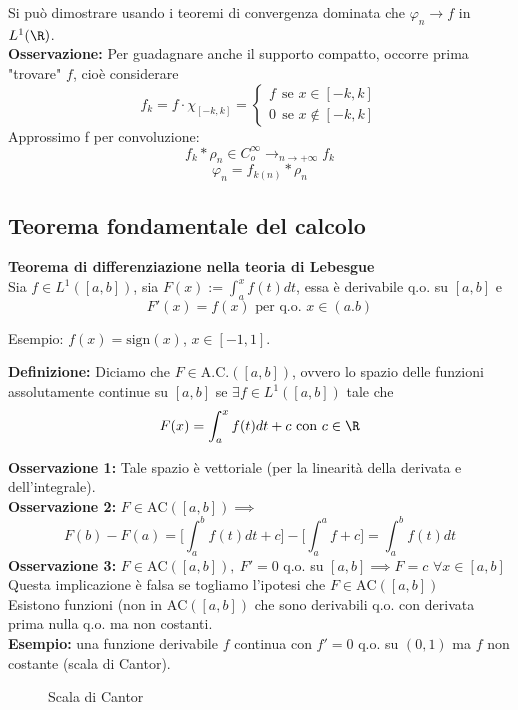 Si può dimostrare usando i teoremi di convergenza dominata che $\varphi_n\to f$ in $L^{1}(\R)$.
\\\textbf{Osservazione:} Per guadagnare anche il supporto compatto, occorre prima "trovare" $f$, cioè considerare
\[f_k=f\cdot \chi_{[-k,k]}=\begin{cases}
	f\ \ \text{se }x\in [-k,k]
	\\0\ \ \text{se }x\not\in [-k,k]
\end{cases}\]
Approssimo f per convoluzione:
\[f_k*\rho_n\in C_o^\infty\to _{n\to +\infty}f_k\]
\[\varphi_n=f_{k(n)}*\rho_n\]
\subsection{Teorema fondamentale del calcolo}
\begin{tcolorbox}
\textbf{Teorema di differenziazione nella teoria di Lebesgue}
\\Sia $f\in L^{1}([a,b])$, sia $F(x):=\int_{a}^{x} f(t)dt$, essa è derivabile q.o. su $[a,b]$ e
\[F'(x)=f(x)\text{ per q.o. }x\in (a.b)\]
\end{tcolorbox}
Esempio: $f(x)=\text{sign}(x)$, $x\in [-1,1]$.
\begin{tcolorbox}
	\textbf{Definizione: }Diciamo che $F\in \text{A.C.}([a,b])$, ovvero lo spazio delle funzioni assolutamente continue su $[a,b]$ se $\exists f\in L^{1}([a,b])$ tale che
	\[F(x)=\int_{a}^{x} f(t)dt+c\text{ con }c\in \R\]
\end{tcolorbox}
\textbf{Osservazione 1:} Tale spazio è vettoriale (per la linearità della derivata e dell'integrale).
\\\textbf{Osservazione 2:} $F\in \text{AC}([a,b])\implies$ 
\[F(b)-F(a)=\bigg[\int_{a}^{b} f(t)dt+c \bigg]-\bigg[\int_{a}^{a} f+c \bigg]=\int_{a}^{b} f(t)dt   \]
\textbf{Osservazione 3:} $F\in \text{AC}([a,b]),\ F'=0$ q.o. su  $[a,b]\implies F=c$ $\forall x\in [a,b]$ \\
Questa implicazione è falsa se togliamo l'ipotesi che $F\in \text{AC}([a,b])$ 
\\Esistono funzioni (non in $\text{AC}([a,b])$ che sono derivabili q.o. con derivata prima nulla q.o. ma non costanti.
\\\textbf{Esempio:} una funzione derivabile $f$ continua con  $f'=0$ q.o. su $(0,1)$ ma $f$ non costante (scala di Cantor).
\begin{figure}[ht]
    \centering
    \caption{Scala di Cantor}
    \label{fig:scaladicantor}
\end{figure}
